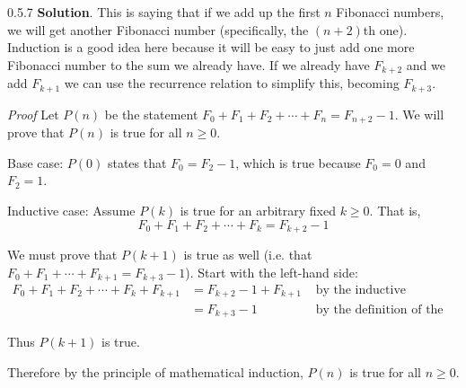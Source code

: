 \documentclass[11pt,]{book}
\makeatletter
\theoremstyle{ptxplainnotitle}
\theoremstyle{ptxplaintitle}
\renewcommand*{\proofname}{Proof}
\renewenvironment{proof}[1][\proofname]{\par
  \pushQED{\qed}%
  \normalfont \topsep6\p@\@plus6\p@\relax
  \trivlist
  \item\relax
    {\itshape
    #1\@addpunct{.}}\hspace\labelsep\ignorespaces
}{%
  \popQED\endtrivlist\@endpefalse
}
\theoremstyle{ptxdefinitionnotitle}
\theoremstyle{ptxdefinitiontitle}
\theoremstyle{ptxdefinitionnotitle}
\theoremstyle{ptxdefinitiontitle}
\theoremstyle{ptxdefinitionnotitle}
\theoremstyle{ptxdefinitiontitle}
\theoremstyle{ptxdefinitiontitlenonumber}
\theoremstyle{ptxdefinitiontitlenonumber}
\numberwithin{equation}{chapter}
\newcommand{\amp}{&}
\makeatother
\begin{document}
\begin{divisionexercise}{0.5.7}
\textbf{Solution}.\quad%
\hypertarget{p-624}{}%
This is saying that if we add up the first \(n\) Fibonacci numbers, we will get another Fibonacci number (specifically, the \((n+2)\)th one). Induction is a good idea here because it will be easy to just add one more Fibonacci number to the sum we already have. If we already have \(F_{k+2}\) and we add \(F_{k+1}\) we can use the recurrence relation to simplify this, becoming \(F_{k+3}\).%
\begin{proof}\hypertarget{proof-10}{}
\hypertarget{p-625}{}%
Let \(P(n)\) be the statement \(F_0 + F_1 + F_2 + \cdots + F_n = F_{n+2} - 1\). We will prove that \(P(n)\) is true for all \(n \ge 0\).%
\par
\hypertarget{p-626}{}%
Base case: \(P(0)\) states that \(F_0 = F_2 - 1\), which is true because \(F_0 = 0\) and \(F_2 = 1\).%
\par
\hypertarget{p-627}{}%
Inductive case: Assume \(P(k)\) is true for an arbitrary fixed \(k \ge 0\). That is,%
\begin{equation*}
F_0 + F_1 + F_2 + \cdots + F_k = F_{k+2} - 1
\end{equation*}
%
\par
\hypertarget{p-628}{}%
We must prove that \(P(k+1)\) is true as well (i.e. that \(F_0 + F_1 + \cdots +F_{k+1} = F_{k+3} - 1\)). Start with the left-hand side:%
\begin{align*}
F_0 + F_1 + F_2 + \cdots + F_k + F_{k+1} \amp = F_{k+2} - 1 + F_{k+1} \amp \mbox{ by the inductive hypothesis}\\
\amp = F_{k+3} - 1 \amp \mbox{ by the definition of the Fibonacci numbers}
\end{align*}
%
\par
\hypertarget{p-629}{}%
Thus \(P(k+1)\) is true.%
\par
\hypertarget{p-630}{}%
Therefore by the principle of mathematical induction, \(P(n)\) is true for all \(n \ge 0\).%
\end{proof}
\end{divisionexercise}%
\end{document}
